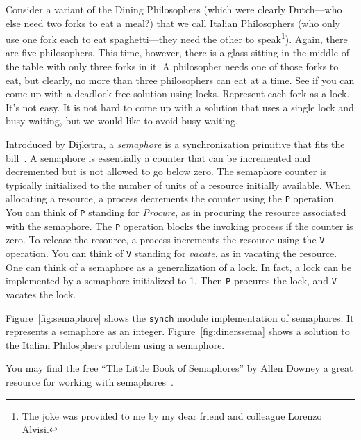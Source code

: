 \documentclass{report}
\begin{document}
Consider a variant of the Dining Philosophers (which were clearly Dutch---who
else need two forks to eat a meal?) that we call Italian Philosophers (who only
use one fork each to eat spaghetti---they need the other to speak\footnote{The joke
was provided to me by my dear friend and colleague Lorenzo Alvisi.}).
Again, there are five philosophers.
This time, however, there is a glass sitting in the middle of the table with only
three forks in it.  A philosopher needs one of those forks to eat, but clearly,
no more than three philosophers can eat at a time.
See if you can come up with a deadlock-free solution using locks.  Represent
each fork as a lock.  It's not easy.
It is not hard to come up with a solution that uses a single lock
and busy waiting, but we would like to avoid busy waiting.

Introduced by Dijkstra,
a \emph{semaphore} is a synchronization primitive that fits the bill~\cite{EWD35}.
A semaphore is essentially
a counter that can be incremented and decremented but is not allowed to go
below zero.  The semaphore counter is typically initialized to the number of
units of a resource initially available.
When allocating a resource, a process decrements the
counter using the \texttt{P}
operation.  You can think of \texttt{P} standing
for \emph{Procure}, as in procuring the resource associated with the semaphore.
The \texttt{P} operation blocks the invoking process if the counter is zero.
To release the resource, a process increments the resource using the
\texttt{V}
operation.  You can think of \texttt{V} standing for \emph{vacate},
as in vacating the resource.
One can think of a semaphore as a generalization of a lock.  In fact, a
lock can be implemented by a semaphore initialized to 1.  Then \texttt{P}
procures the lock, and \texttt{V} vacates the lock.

Figure~\ref{fig:semaphore} shows the \texttt{synch} module implementation of
semaphores.
It represents a semaphore as an integer.
Figure~\ref{fig:dinerssema} shows a solution to the Italian Philosphers problem
using a semaphore.

You may find the free ``The Little Book of Semaphores'' by
Allen Downey a great resource for working with semaphores~\cite{Downey09}.
\end{document}
